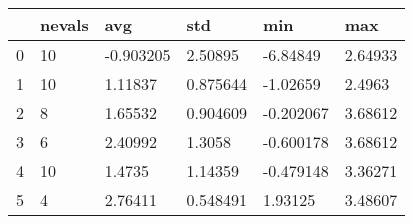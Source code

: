 \begin{table}[h!]
\centering
\begin{tabular}{llllll}
\hline
\rowcolor[HTML]{EFEFEF} 
\multicolumn{1}{|l|}{\cellcolor[HTML]{EFEFEF}gen} & \multicolumn{1}{l|}{\cellcolor[HTML]{EFEFEF}nevals} & \multicolumn{1}{l|}{\cellcolor[HTML]{EFEFEF}avg} & \multicolumn{1}{l|}{\cellcolor[HTML]{EFEFEF}std} & \multicolumn{1}{l|}{\cellcolor[HTML]{EFEFEF}min} & \multicolumn{1}{l|}{\cellcolor[HTML]{EFEFEF}max} \\ \hline
\multicolumn{1}{|l|}{0}                           & \multicolumn{1}{l|}{10}                             & \multicolumn{1}{l|}{-0.903205}                   & \multicolumn{1}{l|}{2.50895}                     & \multicolumn{1}{l|}{-6.84849}                    & \multicolumn{1}{l|}{2.64933}                     \\ \hline
\multicolumn{1}{|l|}{1}                           & \multicolumn{1}{l|}{10}                             & \multicolumn{1}{l|}{1.11837}                     & \multicolumn{1}{l|}{0.875644}                    & \multicolumn{1}{l|}{-1.02659}                    & \multicolumn{1}{l|}{2.4963}                      \\ \hline
\multicolumn{1}{|l|}{2}                           & \multicolumn{1}{l|}{8}                              & \multicolumn{1}{l|}{1.65532}                     & \multicolumn{1}{l|}{0.904609}                    & \multicolumn{1}{l|}{-0.202067}                   & \multicolumn{1}{l|}{3.68612}                     \\ \hline
\multicolumn{1}{|l|}{3}                           & \multicolumn{1}{l|}{6}                              & \multicolumn{1}{l|}{2.40992}                     & \multicolumn{1}{l|}{1.3058}                      & \multicolumn{1}{l|}{-0.600178}                   & \multicolumn{1}{l|}{3.68612}                     \\ \hline
\multicolumn{1}{|l|}{4}                           & \multicolumn{1}{l|}{10}                             & \multicolumn{1}{l|}{1.4735}                      & \multicolumn{1}{l|}{1.14359}                     & \multicolumn{1}{l|}{-0.479148}                   & \multicolumn{1}{l|}{3.36271}                     \\ \hline
\multicolumn{1}{|l|}{5}                           & \multicolumn{1}{l|}{4}                              & \multicolumn{1}{l|}{2.76411}                     & \multicolumn{1}{l|}{0.548491}                    & \multicolumn{1}{l|}{1.93125}                     & \multicolumn{1}{l|}{3.48607}                     \\ \hline

\end{tabular}
\end{table}

